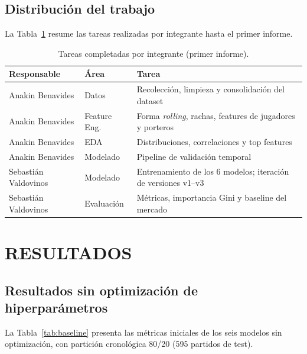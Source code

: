\documentclass[12pt,letterpaper,oneside]{report}
\begin{document}
\section{Distribución del trabajo}
La Tabla~\ref{tab:tareas} resume las tareas realizadas por integrante hasta el primer informe.

\begin{table}[!htbp]
\caption[Tareas completadas por integrante (primer informe)]{Tareas completadas por integrante (primer informe).}
\label{tab:tareas}
\centering
\footnotesize
\setlength{\tabcolsep}{3pt}
\begin{tabular}{@{}p{1.9cm}p{1.7cm}p{4.2cm}@{}}
\toprule
\textbf{Responsable} & \textbf{Área} & \textbf{Tarea} \\
\midrule
Anakin Benavides & Datos & Recolección, limpieza y consolidación del dataset \\
Anakin Benavides & Feature Eng. & Forma \textit{rolling}, rachas, features de jugadores y porteros \\
Anakin Benavides & EDA & Distribuciones, correlaciones y top features \\
Anakin Benavides & Modelado & Pipeline de validación temporal \\
Sebastián Valdovinos & Modelado & Entrenamiento de los 6 modelos; iteración de versiones v1--v3 \\
Sebastián Valdovinos & Evaluación & Métricas, importancia Gini y baseline del mercado \\
\bottomrule
\end{tabular}
\par{}
\end{table}

\chapter{RESULTADOS}
\label{sec:resultados}

\section{Resultados sin optimización de hiperparámetros}
La Tabla~\ref{tab:baseline} presenta las métricas iniciales de los seis modelos sin optimización, con partición cronológica 80/20 (595 partidos de test).
\end{document}
